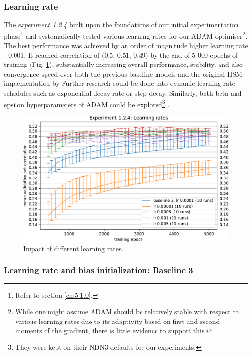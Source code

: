 \subsubsection{Learning rate}\label{ex:1.2.4}

The \emph{experiment 1.2.4} built upon the foundations of our initial experimentation phase\footnote{Refer to section \ref{ch:5.1.0}.} and systematically tested various learning rates for our ADAM optimiser\footnote{While one might assume ADAM should be relatively stable with respect to various learning rates due to its adaptivity based on first and second moments of the gradient, there is little evidence to support this.}. The best performance was achieved by an order of magnitude higher learning rate - 0.001. It reached correlation of (0.5, 0.51, 0.49) by the end of 5 000 epochs of training (Fig. \ref{fig:5.1.2.4}), substantially increasing overall performance, stability, and also convergence speed over both the previous baseline models and the original HSM implementation by \citeauthor{antolik} Further research could be done into dynamic learning rate schedules such as exponential decay rate or step decay. Similarly, both beta and epsilon hyperparameters of ADAM could be explored\footnote{They were kept on their NDN3 defaults for our experiments.} \citep{2019arXiv191005446C}.


\begin{figure}[H]
    \centering
    \includegraphics[width=1\textwidth]{../figures/05_1_2_4}
    \caption[Experiment 1.2.4]{Impact of different learning rates.}
    \label{fig:5.1.2.4}
\end{figure}

\subsubsection{Learning rate and bias initialization: Baseline 3}\label{ex:1.2.5}

